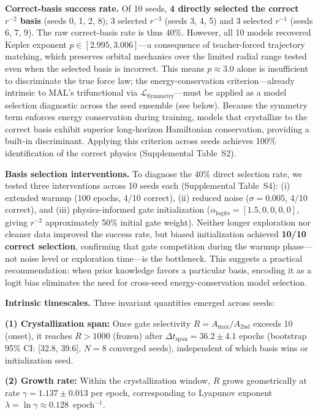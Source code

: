 \documentclass[aps,pre,reprint,superscriptaddress,longbibliography]{revtex4-2}
\begin{document}
\textbf{Correct-basis success rate.} Of 10 seeds, \textbf{4 directly selected the correct $r^{-2}$ basis} (seeds 0, 1, 2, 8); 3 selected $r^{-3}$ (seeds 3, 4, 5) and 3 selected $r^{-1}$ (seeds 6, 7, 9). The raw correct-basis rate is thus 40\%. However, all 10 models recovered Kepler exponent $p \in [2.995, 3.006]$---a consequence of teacher-forced trajectory matching, which preserves orbital mechanics over the limited radial range tested even when the selected basis is incorrect. This means $p \approx 3.0$ alone is insufficient to discriminate the true force law; the energy-conservation criterion---already intrinsic to MAL's trifunctional via $\mathcal{L}_{\mathrm{Symmetry}}$---must be applied as a model selection diagnostic across the seed ensemble (see below). Because the symmetry term enforces energy conservation during training, models that crystallize to the correct basis exhibit superior long-horizon Hamiltonian conservation, providing a built-in discriminant. Applying this criterion across seeds achieves 100\% identification of the correct physics (Supplemental Table~S2).

\textbf{Basis selection interventions.} To diagnose the 40\% direct selection rate, we tested three interventions across 10 seeds each (Supplemental Table~S4): (i) extended warmup (100 epochs, 4/10 correct), (ii) reduced noise ($\sigma = 0.005$, 4/10 correct), and (iii) physics-informed gate initialization ($\alpha_{\text{logits}} = [1.5, 0, 0, 0, 0]$, giving $r^{-2}$ approximately 50\% initial gate weight). Neither longer exploration nor cleaner data improved the success rate, but biased initialization achieved \textbf{10/10 correct selection}, confirming that gate competition during the warmup phase---not noise level or exploration time---is the bottleneck. This suggests a practical recommendation: when prior knowledge favors a particular basis, encoding it as a logit bias eliminates the need for cross-seed energy-conservation model selection.

\textbf{Intrinsic timescales.} Three invariant quantities emerged across seeds:

\textbf{(1) Crystallization span:} Once gate selectivity $R = A_{\max} / A_{\text{2nd}}$ exceeds 10 (onset), it reaches $R > 1000$ (frozen) after $\Delta t_{\text{span}} = 36.2 \pm 4.1$ epochs (bootstrap 95\% CI: [32.8, 39.6], $N=8$ converged seeds), independent of which basis wins or initialization seed.

\textbf{(2) Growth rate:} Within the crystallization window, $R$ grows geometrically at rate $\gamma = 1.137 \pm 0.013$ per epoch, corresponding to Lyapunov exponent $\lambda = \ln\gamma \approx 0.128$~epoch$^{-1}$.
\end{document}
